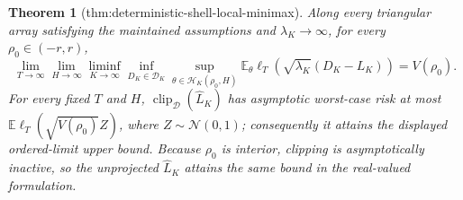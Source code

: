 \documentclass{article}
\newtheorem{theorem}{Theorem}
\begin{document}
\begin{theorem}[thm:deterministic-shell-local-minimax]\label{thm:deterministic-shell-local-minimax}
Along every triangular array satisfying the maintained assumptions and \(\lambda_K\to\infty\), for every \(\rho_0\in(-r,r)\),
\[
 \lim_{T\to\infty}\lim_{H\to\infty}\liminf_{K\to\infty}
 \inf_{D_K\in\mathscr D_K}
 \sup_{\theta\in\mathcal H_K(\rho_0,H)}
 \mathbb E_\theta\ell_T\!\left(\sqrt{\lambda_K}(D_K-L_K)\right)
 =V(\rho_0).
\]
For every fixed \(T\) and \(H\), \(\operatorname{clip}_{\mathcal D}(\widehat L_K)\) has asymptotic worst-case risk at most \(\mathbb E\ell_T(\sqrt{V(\rho_0)}Z)\), where \(Z\sim\mathcal N(0,1)\); consequently it attains the displayed ordered-limit upper bound.  Because \(\rho_0\) is interior, clipping is asymptotically inactive, so the unprojected \(\widehat L_K\) attains the same bound in the real-valued formulation.
\end{theorem}
\end{document}
